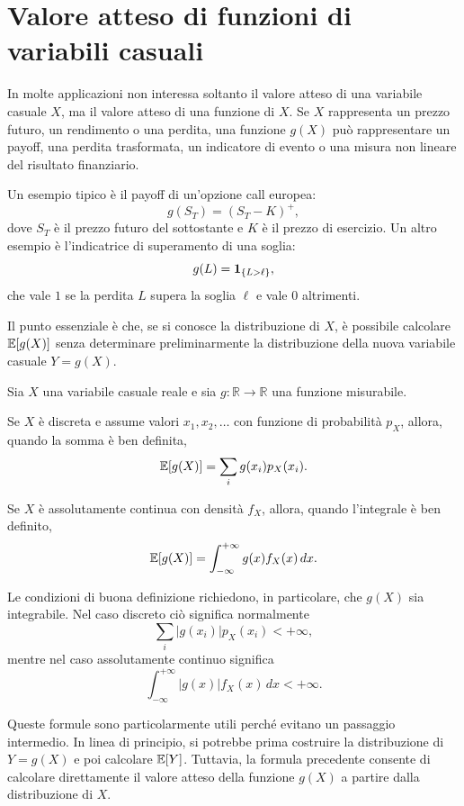 \section{Valore atteso di funzioni di variabili casuali}
\label{sec:cap2-valore-atteso-funzioni}

In molte applicazioni non interessa soltanto il valore atteso di una variabile
casuale $X$, ma il valore atteso di una funzione di $X$. Se $X$ rappresenta un
prezzo futuro, un rendimento o una perdita, una funzione $g(X)$ pu\`{o}
rappresentare un payoff, una perdita trasformata, un indicatore di evento o una
misura non lineare del risultato finanziario.

Un esempio tipico \`{e} il payoff di un'opzione call europea:
\[
g(S_T)=(S_T-K)^+,
\]
dove $S_T$ \`{e} il prezzo futuro del sottostante e $K$ \`{e} il prezzo di
esercizio. Un altro esempio \`{e} l'indicatrice di superamento di una soglia:
\[
g(L)=\mathbf{1}_{\{L>\ell\}},
\]
che vale $1$ se la perdita $L$ supera la soglia $\ell$ e vale $0$ altrimenti.

Il punto essenziale \`{e} che, se si conosce la distribuzione di $X$, \`{e}
possibile calcolare $\mathbb{E}[g(X)]$ senza determinare preliminarmente la
distribuzione della nuova variabile casuale $Y=g(X)$.

\begin{proposition}
\par\smallskip
Sia $X$ una variabile casuale reale e sia $g:\mathbb{R}\to\mathbb{R}$ una
funzione misurabile.

Se $X$ \`{e} discreta e assume valori $x_1,x_2,\ldots$ con funzione di
probabilit\`{a} $p_X$, allora, quando la somma \`{e} ben definita,
\[
\mathbb{E}[g(X)]
=
\sum_i g(x_i)p_X(x_i).
\]

Se $X$ \`{e} assolutamente continua con densit\`{a} $f_X$, allora, quando
l'integrale \`{e} ben definito,
\[
\mathbb{E}[g(X)]
=
\int_{-\infty}^{+\infty} g(x)f_X(x)\,dx.
\]
\end{proposition}

Le condizioni di buona definizione richiedono, in particolare, che $g(X)$ sia
integrabile. Nel caso discreto ci\`{o} significa normalmente
\[
\sum_i |g(x_i)|p_X(x_i)<+\infty,
\]
mentre nel caso assolutamente continuo significa
\[
\int_{-\infty}^{+\infty}|g(x)|f_X(x)\,dx<+\infty.
\]

Queste formule sono particolarmente utili perch\'{e} evitano un passaggio
intermedio. In linea di principio, si potrebbe prima costruire la distribuzione
di $Y=g(X)$ e poi calcolare $\mathbb{E}[Y]$. Tuttavia, la formula precedente consente di
calcolare direttamente il valore atteso della funzione $g(X)$ a partire dalla
distribuzione di $X$.

